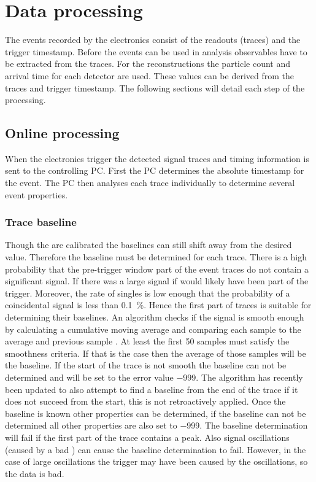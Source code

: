 \chapter{Data processing}
\label{ch:data_processing}

The events recorded by the \hisparc electronics consist of the \pmt readouts (traces) and the trigger timestamp. Before the events can be used in analysis observables have to be extracted from the traces. For the reconstructions the particle count and arrival time for each detector are used. These values can be derived from the traces and trigger timestamp. The following sections will detail each step of the processing.

\section{Online processing}

When the \hisparc electronics trigger the detected signal traces and timing information is sent to the controlling PC. First the PC determines the absolute \gps timestamp for the event. The PC then analyses each trace individually to determine several event properties.


\subsection{Trace baseline}

Though the \adcs are calibrated the baselines can still shift away from the desired value. Therefore the baseline must be determined for each trace. There is a high probability that the pre-trigger window part of the event traces do not contain a significant signal. If there was a large signal if would likely have been part of the trigger. Moreover, the rate of singles is low enough that the probability of a coincidental signal is less than \SI{0.1}{\percent}. Hence the first part of traces is suitable for determining their baselines. An algorithm checks if the signal is smooth enough by calculating a cumulative moving average and comparing each sample to the average and previous sample \cite{oostenbrugge2014daq}. At least the first 50 samples must satisfy the smoothness criteria. If that is the case then the average of those samples will be the baseline. If the start of the trace is not smooth the baseline can not be determined and will be set to the error value \num{-999}. The algorithm has recently been updated to also attempt to find a baseline from the end of the trace if it does not succeed from the start, this is not retroactively applied. Once the baseline is known other properties can be determined, if the baseline can not be determined all other properties are also set to \num{-999}. The baseline determination will fail if the first part of the trace contains a peak. Also signal oscillations (caused by a bad \pmt) can cause the baseline determination to fail. However, in the case of large oscillations the trigger may have been caused by the oscillations, so the data is bad.


